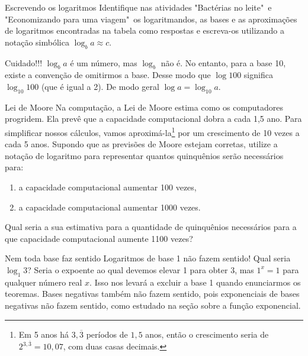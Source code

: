 \begin{task}{Escrevendo os logaritmos}
Identifique nas atividades "Bactérias no leite"\, e "Economizando para uma viagem"\, os logaritmandos, as bases e as aproximações de logaritmos encontradas na tabela como respostas e escreva-os utilizando a notação simbólica $\log_b a \approx c$.
\end{task}


\begin{observation}{Cuidado!!!}
$\log_b a$ é um número, mas $\log_b$ não é. No entanto, para a base 10, existe a convenção de omitirmos a base. Desse modo que $\log 100$ significa $\log_{10} 100$ (que é igual a 2). De modo geral $\log a =\log_{10} a$.
\end{observation}


\begin{task}{Lei de Moore}
Na computação, a Lei de Moore estima como os computadores progridem. Ela prevê que a capacidade computacional dobra a cada 1,5 ano. Para simplificar nossos cálculos, vamos aproximá-la\footnote{Em 5 anos há $3,\overline{3}$ períodos de $1,5$ anos, então o crescimento seria de $2^{3,\overline{3}} = 10,07$, com duas casas decimais.} por um crescimento de 10 vezes a cada 5 anos. Supondo que as previsões de Moore estejam corretas, utilize a notação de logaritmo para representar quantos quinquênios serão necessários para:
\begin{enumerate}
\item a capacidade computacional aumentar 100 vezes,
\item a capacidade computacional aumentar 1000 vezes.
\end{enumerate}
Qual seria a sua estimativa para a quantidade de quinquênios necessários para a que capacidade computacional aumente 1100 vezes?
\end{task}

\begin{observation}{Nem toda base faz sentido}
Logaritmos de base 1 não fazem sentido! Qual seria $\log_1 3$? Seria o expoente ao qual devemos elevar 1 para obter 3, mas $1^x = 1$ para qualquer número real $x$. Isso nos levará a excluir a base 1 quando enunciarmos os teoremas. Bases negativas também não fazem sentido, pois exponenciais de bases negativas não fazem sentido, como estudado na seção sobre a função exponencial.
\end{observation}

